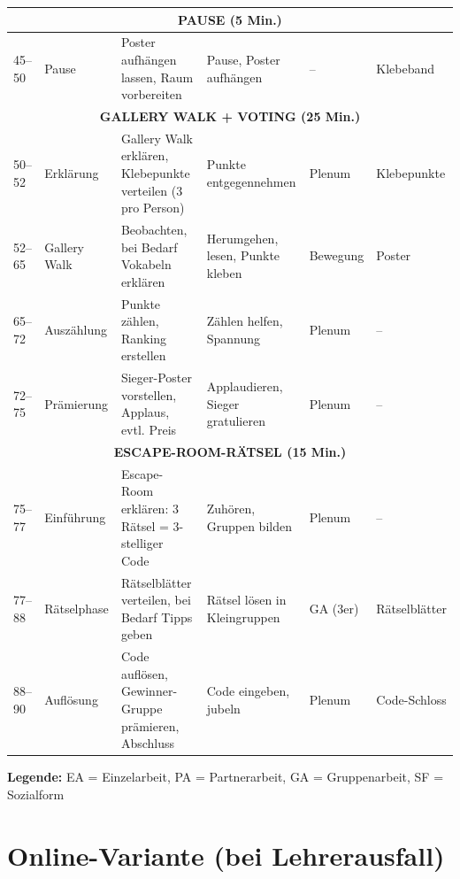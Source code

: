 \documentclass[11pt,a4paper]{article}
\begin{document}
\begin{longtable}{|p{0.8cm}|p{1.8cm}|p{3.8cm}|p{3cm}|p{1.3cm}|p{2cm}|}
\multicolumn{6}{|c|}{\textbf{PAUSE (5 Min.)}} \\
\hline

45--50 & Pause & Poster aufhängen lassen, Raum vorbereiten & Pause, Poster aufhängen & -- & Klebeband \\
\hline

\multicolumn{6}{|c|}{\textbf{GALLERY WALK + VOTING (25 Min.)}} \\
\hline

50--52 & Erklärung & Gallery Walk erklären, Klebepunkte verteilen (3 pro Person) & Punkte entgegennehmen & Plenum & Klebepunkte \\
\hline

52--65 & Gallery Walk & Beobachten, bei Bedarf Vokabeln erklären & Herumgehen, lesen, Punkte kleben & Bewegung & Poster \\
\hline

65--72 & Auszählung & Punkte zählen, Ranking erstellen & Zählen helfen, Spannung & Plenum & -- \\
\hline

72--75 & Prämierung & Sieger-Poster vorstellen, Applaus, evtl. Preis & Applaudieren, Sieger gratulieren & Plenum & -- \\
\hline

\multicolumn{6}{|c|}{\textbf{ESCAPE-ROOM-RÄTSEL (15 Min.)}} \\
\hline

75--77 & Einführung & Escape-Room erklären: 3 Rätsel = 3-stelliger Code & Zuhören, Gruppen bilden & Plenum & -- \\
\hline

77--88 & Rätselphase & Rätselblätter verteilen, bei Bedarf Tipps geben & Rätsel lösen in Kleingruppen & GA (3er) & Rätselblätter \\
\hline

88--90 & Auflösung & Code auflösen, Gewinner-Gruppe prämieren, Abschluss & Code eingeben, jubeln & Plenum & Code-Schloss \\
\hline

\end{longtable}

\textbf{Legende:} EA = Einzelarbeit, PA = Partnerarbeit, GA = Gruppenarbeit, SF = Sozialform

\section{Online-Variante (bei Lehrerausfall)}
\end{document}
